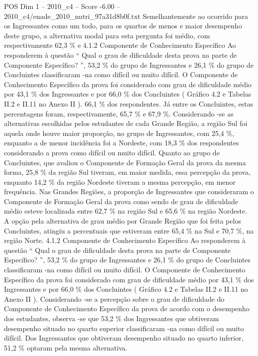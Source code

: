 \begin{textsample}{POS Dim 1 – 2010\_c4 – Score -6.00 – 2010\_c4/enade\_2010\_nutri\_97a31d8b0f.txt}
Semelhantemente ao ocorrido para os Ingressantes como um todo, para os quartos de menos e maior desempenho deste grupo, a alternativa modal para esta pergunta foi médio, com respectivamente 62,3 \% e 4.1.2 Componente de Conhecimento Específico Ao responderem à questão “ Qual o grau de dificuldade desta prova na parte de Componente Específico? ”, 53,2 \% do grupo de Ingressantes e 26,1 \% do grupo de Concluintes classificaram -na como difícil ou muito difícil.
O Componente de Conhecimento Específico da prova foi considerado com grau de dificuldade médio por 43,1 \% dos Ingressantes e por 66,0 \% dos Concluintes ( Gráfico 4.2 e Tabelas II.2 e II.11 no Anexo II ). 66,1 \% dos respondentes.
Já entre os Concluintes, estas percentagens foram, respectivamente, 65,7 \% e 67,9 \%.
Considerando -se as alternativas escolhidas pelos estudantes de cada Grande Região, a região Sul foi aquela onde houve maior proporção, no grupo de Ingressantes, com 25,4 \%, enquanto a de menor incidência foi a Nordeste, com 18,3 \% dos respondentes considerando a prova como difícil ou muito difícil.
Quanto ao grupo de Concluintes, que avaliou o Componente de Formação Geral da prova da mesma forma, 25,8 \% da região Sul tiveram, em maior medida, essa percepção da prova, enquanto 14,2 \% da região Nordeste tiveram a mesma percepção, em menor frequência.
Nas Grandes Regiões, a proporção de Ingressantes que consideraram o Componente de Formação Geral da prova como sendo de grau de dificuldade médio esteve localizada entre 62,7 \% na região Sul e 65,6 \% na região Nordeste.
A opção pela alternativa de grau médio por Grande Região que foi feita pelos Concluintes, atingiu a percentuais que estiveram entre 65,4 \% na Sul e 70,7 \%, na região Norte. 4.1.2 Componente de Conhecimento Específico Ao responderem à questão “ Qual o grau de dificuldade desta prova na parte de Componente Específico? ”, 53,2 \% do grupo de Ingressantes e 26,1 \% do grupo de Concluintes classificaram -na como difícil ou muito difícil.
O Componente de Conhecimento Específico da prova foi considerado com grau de dificuldade médio por 43,1 \% dos Ingressantes e por 66,0 \% dos Concluintes ( Gráfico 4.2 e Tabelas II.2 e II.11 no Anexo II ).
Considerando -se a percepção sobre o grau de dificuldade do Componente de Conhecimento Específico da prova de acordo com o desempenho dos estudantes, observa -se que 53,2 \% dos Ingressantes que obtiveram desempenho situado no quarto superior classificaram -na como difícil ou muito difícil.
Dos Ingressantes que obtiveram desempenho situado no quarto inferior, 51,2 \% optaram pela mesma alternativa.

\end{textsample}
